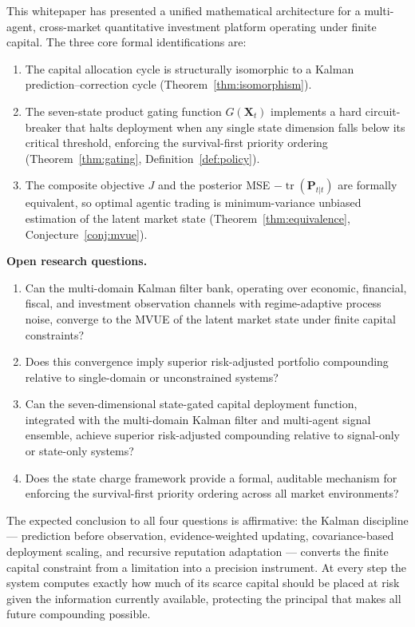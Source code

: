 \documentclass[12pt,openany]{book}
\DeclareMathOperator{\tr}{tr}
\numberwithin{equation}{chapter}
\theoremstyle{plain}
\theoremstyle{definition}
\theoremstyle{remark}
\begin{document}
\noindent
This whitepaper has presented a unified mathematical architecture
for a multi-agent, cross-market quantitative investment platform
operating under finite capital.  The three core formal
identifications are:

\begin{enumerate}[leftmargin=2em, itemsep=4pt]
  \item The capital allocation cycle is structurally isomorphic
        to a Kalman prediction--correction cycle
        (Theorem~\ref{thm:isomorphism}).
  \item The seven-state product gating function $G(\mathbf{X}_t)$
        implements a hard circuit-breaker that halts deployment
        when any single state dimension falls below its critical
        threshold, enforcing the survival-first priority ordering
        (Theorem~\ref{thm:gating}, Definition~\ref{def:policy}).
  \item The composite objective $J$ and the posterior MSE
        $-\tr(\mathbf{P}_{t|t})$ are formally equivalent, so
        optimal agentic trading is minimum-variance unbiased
        estimation of the latent market state
        (Theorem~\ref{thm:equivalence}, Conjecture~\ref{conj:mvue}).
\end{enumerate}

\noindent
\textbf{Open research questions.}
\begin{enumerate}[leftmargin=2em, itemsep=3pt]
  \item Can the multi-domain Kalman filter bank, operating over
        economic, financial, fiscal, and investment observation
        channels with regime-adaptive process noise, converge to
        the MVUE of the latent market state under finite capital
        constraints?
  \item Does this convergence imply superior risk-adjusted portfolio
        compounding relative to single-domain or unconstrained systems?
  \item Can the seven-dimensional state-gated capital deployment
        function, integrated with the multi-domain Kalman filter
        and multi-agent signal ensemble, achieve superior
        risk-adjusted compounding relative to signal-only or
        state-only systems?
  \item Does the state charge framework provide a formal, auditable
        mechanism for enforcing the survival-first priority ordering
        across all market environments?
\end{enumerate}

\noindent
The expected conclusion to all four questions is affirmative: the
Kalman discipline --- prediction before observation,
evidence-weighted updating, covariance-based deployment scaling, and
recursive reputation adaptation --- converts the finite capital
constraint from a limitation into a precision instrument.  At every
step the system computes exactly how much of its scarce capital
should be placed at risk given the information currently available,
protecting the principal that makes all future compounding possible.
\end{document}
